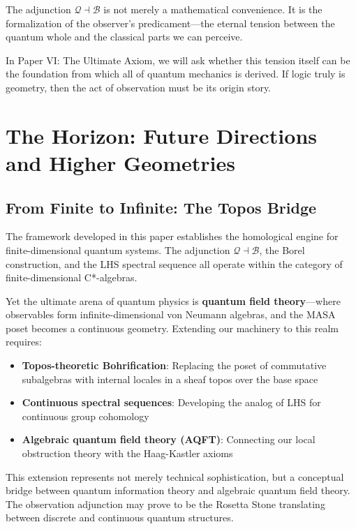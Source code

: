 \documentclass[11pt]{article}
\begin{document}
The adjunction $\mathcal{Q} \dashv \mathcal{B}$ is not merely a mathematical convenience. It is the formalization of the observer's predicament---the eternal tension between the quantum whole and the classical parts we can perceive.

In Paper VI: The Ultimate Axiom, we will ask whether this tension itself can be the foundation from which all of quantum mechanics is derived. If logic truly is geometry, then the act of observation must be its origin story.

\section{The Horizon: Future Directions and Higher Geometries}
\label{horizon}

\subsection{From Finite to Infinite: The Topos Bridge}
\label{topos-bridge}

The framework developed in this paper establishes the homological engine for finite-dimensional quantum systems. The adjunction $\mathcal{Q} \dashv \mathcal{B}$, the Borel construction, and the LHS spectral sequence all operate within the category of finite-dimensional C*-algebras.

Yet the ultimate arena of quantum physics is \textbf{quantum field theory}---where observables form infinite-dimensional von Neumann algebras, and the MASA poset becomes a continuous geometry. Extending our machinery to this realm requires:

\begin{itemize}
\item \textbf{Topos-theoretic Bohrification}: Replacing the poset of commutative subalgebras with internal locales in a sheaf topos over the base space
\item \textbf{Continuous spectral sequences}: Developing the analog of LHS for continuous group cohomology
\item \textbf{Algebraic quantum field theory (AQFT)}: Connecting our local obstruction theory with the Haag-Kastler axioms
\end{itemize}

This extension represents not merely technical sophistication, but a conceptual bridge between quantum information theory and algebraic quantum field theory. The observation adjunction may prove to be the Rosetta Stone translating between discrete and continuous quantum structures.
\end{document}
